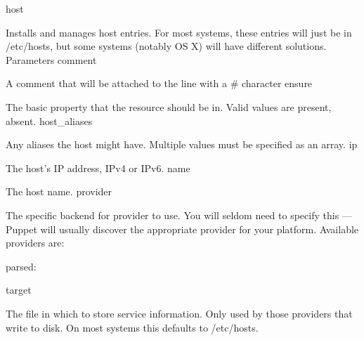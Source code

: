 host

Installs and manages host entries. For most systems, these entries will just be in /etc/hosts, but some systems (notably OS X) will have different solutions.
Parameters
comment

A comment that will be attached to the line with a # character
ensure

The basic property that the resource should be in. Valid values are present, absent.
host_aliases

Any aliases the host might have. Multiple values must be specified as an array.
ip

The host’s IP address, IPv4 or IPv6.
name

The host name.
provider

The specific backend for provider to use. You will seldom need to specify this — Puppet will usually discover the appropriate provider for your platform. Available providers are:

    parsed:

target

The file in which to store service information. Only used by those providers that write to disk. On most systems this defaults to /etc/hosts.
